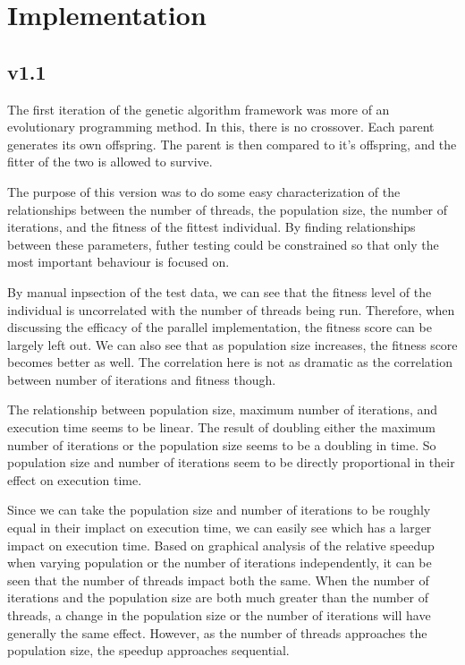 \documentclass[10pt,letterpaper]{article}
\begin{document}
\section{Implementation}
\subsection{v1.1}
The first iteration of the genetic algorithm framework was more of an evolutionary programming method. In this, there is no crossover. Each parent generates its own offspring. The parent is then compared to it's offspring, and the fitter of the two is allowed to survive. 

The purpose of this version was to do some easy characterization of the relationships between the number of threads, the population size, the number of iterations, and the fitness of the fittest individual. By finding relationships between these parameters, futher testing could be constrained so that only the most important behaviour is focused on. 

By manual inpsection of the test data, we can see that the fitness level of the individual is uncorrelated with the number of threads being run. Therefore, when discussing the efficacy of the parallel implementation, the fitness score can be largely left out. We can also see that as population size increases, the fitness score becomes better as well. The correlation here is not as dramatic as the correlation between number of iterations and fitness though.

The relationship between population size, maximum number of iterations, and execution time seems to be linear. The result of doubling either the maximum number of iterations or the population size seems to be a doubling in time. So population size and number of iterations seem to be directly proportional in their effect on execution time. 

Since we can take the population size and number of iterations to be roughly equal in their implact on execution time, we can easily see which has a larger impact on execution time. Based on graphical analysis of the relative speedup when varying population or the number of iterations independently, it can be seen that the number of threads impact both the same. %
When the number of iterations and the population size are both much greater than the number of threads, a change in the population size or the number of iterations will have generally the same effect. However, as the number of threads approaches the population size, the speedup approaches sequential.
\end{document}
